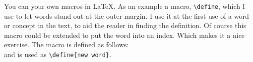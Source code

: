 You can  your own macros in \LaTeX. As an example a macro,
\verb#\define#, which I use
to let words stand out at the outer margin. I use it at the first use
of a word or concept in the text, to aid the reader in finding the
definition. Of course this macro could be extended to put the word
into an index. Which makes it a nice exercise.
The macro is defined as follows:\\


and is used as \verb#\define{new word}#.


